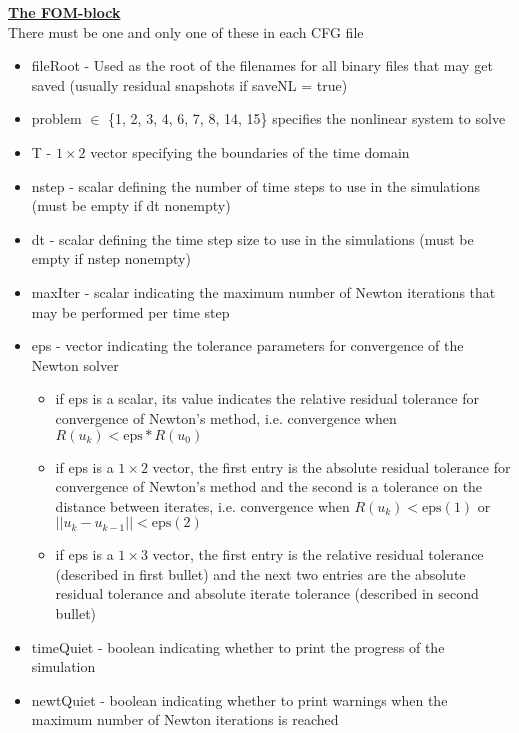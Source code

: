\documentclass[notitlepage]{report}
\begin{document}
\vspace{2mm}
\noindent \underline{\textbf{The FOM-block }} \\
There must be one and only one of these in each CFG file
\begin{itemize}
  \item fileRoot - Used as the root of the filenames for all binary files that may get saved (usually residual snapshots if saveNL = true)
  \item problem $\in$ \{1, 2, 3, 4, 6, 7, 8, 14, 15\} specifies the nonlinear system to solve
  \item T - $1 \times 2$ vector specifying the boundaries of the time domain
  \item nstep - scalar defining the number of time steps to use in the simulations (must be empty if dt nonempty)
  \item dt - scalar defining the time step size to use in the simulations (must be empty if nstep nonempty)
  \item maxIter - scalar indicating the maximum number of Newton iterations that may be performed per time step
  \item eps - vector indicating the tolerance parameters for convergence of the Newton solver
      \begin{itemize}
        \item if eps is a scalar, its value indicates the relative residual tolerance for convergence of Newton's method, i.e. convergence when $R(u_k) < \text{eps}*R(u_0)$
        \item if eps is a $1 \times 2$ vector, the first entry is the absolute residual tolerance for convergence of Newton's method and the second is a tolerance on the distance between iterates, i.e. convergence when $R(u_k) < \text{eps}(1)$ or $||u_{k} - u_{k-1}|| < \text{eps}(2)$
        \item if eps is a $1 \times 3$ vector, the first entry is the relative residual tolerance (described in first bullet) and the next two entries are the absolute residual tolerance and absolute iterate tolerance (described in second bullet)
      \end{itemize}
  \item timeQuiet - boolean indicating whether to print the progress of the simulation
  \item newtQuiet - boolean indicating whether to print warnings when the maximum number of Newton iterations is reached
\end{itemize}
\end{document}
